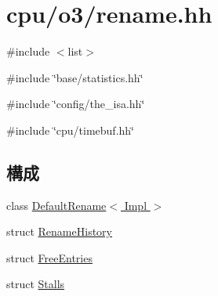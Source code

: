 \hypertarget{rename_8hh}{
\section{cpu/o3/rename.hh}
\label{rename_8hh}
}
{\ttfamily \#include $<$list$>$}\par
{\ttfamily \#include \char`\"{}base/statistics.hh\char`\"{}}\par
{\ttfamily \#include \char`\"{}config/the\_\-isa.hh\char`\"{}}\par
{\ttfamily \#include \char`\"{}cpu/timebuf.hh\char`\"{}}\par
\subsection*{構成}
\begin{DoxyCompactItemize}
\item 
class \hyperlink{classDefaultRename}{DefaultRename$<$ Impl $>$}
\item 
struct \hyperlink{structDefaultRename_1_1RenameHistory}{RenameHistory}
\item 
struct \hyperlink{structDefaultRename_1_1FreeEntries}{FreeEntries}
\item 
struct \hyperlink{structDefaultRename_1_1Stalls}{Stalls}
\end{DoxyCompactItemize}
